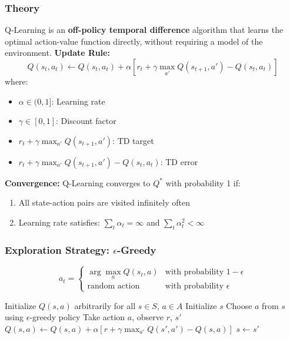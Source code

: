 \documentclass[12pt,a4paper]{article}
\begin{document}
\subsubsection{Theory}
Q-Learning is an \textbf{off-policy temporal difference} algorithm that learns the optimal action-value function directly, without requiring a model of the environment.
\textbf{Update Rule:}
\begin{equation}
    Q(s_t, a_t) \leftarrow Q(s_t, a_t) + \alpha \left[ r_t + \gamma \max_{a'} Q(s_{t+1}, a') - Q(s_t, a_t) \right]
\end{equation}
where:
\begin{itemize}
    \item $\alpha \in (0, 1]$: Learning rate
    \item $\gamma \in [0, 1]$: Discount factor
    \item $r_t + \gamma \max_{a'} Q(s_{t+1}, a')$: TD target
    \item $r_t + \gamma \max_{a'} Q(s_{t+1}, a') - Q(s_t, a_t)$: TD error
\end{itemize}
\textbf{Convergence:} Q-Learning converges to $Q^*$ with probability 1 if:
\begin{enumerate}
    \item All state-action pairs are visited infinitely often
    \item Learning rate satisfies: $\sum_t \alpha_t = \infty$ and $\sum_t \alpha_t^2 < \infty$
\end{enumerate}
\subsubsection{Exploration Strategy: $\epsilon$-Greedy}
\begin{equation}
    a_t = \begin{cases}
        \arg\max_a Q(s_t, a) & \text{with probability } 1-\epsilon \\
        \text{random action} & \text{with probability } \epsilon
    \end{cases}
\end{equation}
\begin{algorithm}[H]
\caption{Q-Learning Algorithm}
\label{alg:qlearning}
\begin{algorithmic}[1]
\State Initialize $Q(s, a)$ arbitrarily for all $s \in S$, $a \in A$
    \State Initialize $s$
        \State Choose $a$ from $s$ using $\epsilon$-greedy policy
        \State Take action $a$, observe $r$, $s'$
        \State $Q(s, a) \leftarrow Q(s, a) + \alpha [r + \gamma \max_{a'} Q(s', a') - Q(s, a)]$
        \State $s \leftarrow s'$
    \EndWhile
\EndFor
\end{algorithmic}
\end{algorithm}
\end{document}
